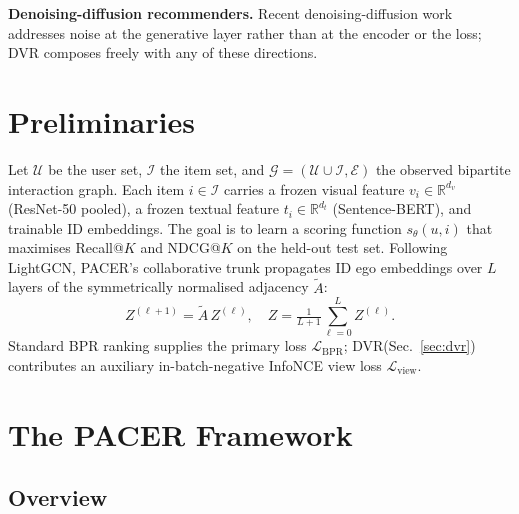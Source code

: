 \documentclass[conference]{IEEEtran}
\newcommand{\Lcal}{\mathcal{L}}
\newcommand{\Ucal}{\mathcal{U}}
\newcommand{\Ical}{\mathcal{I}}
\newcommand{\Ecal}{\mathcal{E}}
\newcommand{\dvr}{DVR\xspace}
\begin{document}
\noindent\textbf{Denoising-diffusion recommenders.}
Recent denoising-diffusion
work~\cite{jiang2024diffmm,jiang2024diffkg,nguyen2024diffusion}
addresses noise at the generative layer rather than at the encoder or
the loss; \dvr composes freely with any of these directions.

\section{Preliminaries}
\label{sec:prelim}

Let $\Ucal$ be the user set, $\Ical$ the item set, and $\mathcal{G} =
(\Ucal \cup \Ical, \Ecal)$ the observed bipartite interaction graph.
Each item $i \in \Ical$ carries a frozen visual feature
$v_i \in \mathbb{R}^{d_v}$ (ResNet-50 pooled), a frozen textual feature
$t_i \in \mathbb{R}^{d_t}$ (Sentence-BERT), and trainable ID embeddings.
The goal is to learn a scoring function $s_\theta(u, i)$ that
maximises Recall@$K$ and NDCG@$K$ on the held-out test set. Following
LightGCN, PACER's collaborative trunk propagates ID ego embeddings over
$L$ layers of
the symmetrically normalised adjacency $\tilde A$:
\begin{equation}
Z^{(\ell+1)} = \tilde A\, Z^{(\ell)},\quad
Z = \tfrac{1}{L+1} \sum_{\ell=0}^{L} Z^{(\ell)}.
\label{eq:lightgcn}
\end{equation}
Standard BPR ranking supplies the primary loss $\Lcal_{\text{BPR}}$;
\dvr (Sec.~\ref{sec:dvr}) contributes an auxiliary
in-batch-negative InfoNCE view loss $\Lcal_{\text{view}}$.

\section{The PACER Framework}
\label{sec:pacer}

\subsection{Overview}
\label{sec:overview}
\end{document}
